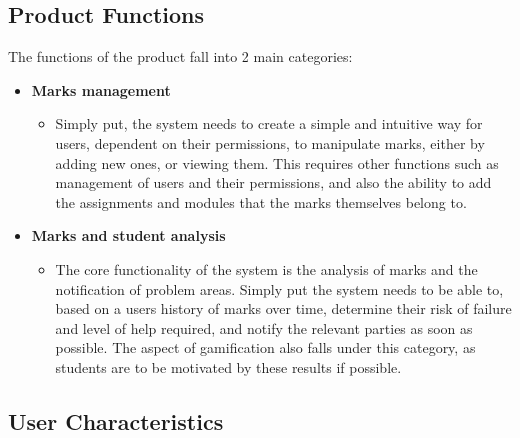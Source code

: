 \documentclass[a4paper,12pt]{article}
\begin{document}
        \subsection{Product Functions}
        
        The functions of the product fall into 2 main categories:
        
        	\begin{itemize}
        		\item \textbf{Marks management}
        		\begin{itemize}
        			\item Simply put, the system needs to create a simple and intuitive way for users, dependent on their permissions, to manipulate marks, either by adding new ones, or viewing them. This requires other functions such as management of users and their permissions, and also the ability to add the assignments and modules that the marks themselves belong to.
        		\end{itemize}
        	\end{itemize}
        
        	
        	\begin{itemize}
        		\item \textbf{Marks and student analysis}
        		\begin{itemize}
        			\item The core functionality of the system is the analysis of marks and the notification of problem areas. Simply put the system needs to be able to, based on a users history of marks over time, determine their risk of failure and level of help required, and notify the relevant parties as soon as possible. The aspect of gamification also falls under this category, as students are to be motivated by these results if possible.
        		\end{itemize}
        	\end{itemize}
        
        \pagebreak
        
        \subsection{User Characteristics}
        
\end{document}
